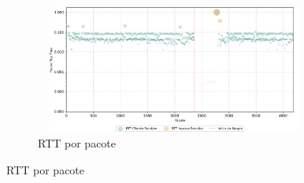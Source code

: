 \begin{apendicesenv}
\begin{figure}[htbp!]
    ~
    \begin{subfigure}[t]{0.5\textwidth}
        \centering
        \caption{RTT por pacote}
        \includegraphics[width=1\textwidth, height=120pt]{USPSC-img/output/cropped/0-dos_translate_browse_path_call_stack_overflow-rttp.png}
    \end{subfigure}%
\end{figure}


\end{apendicesenv}
